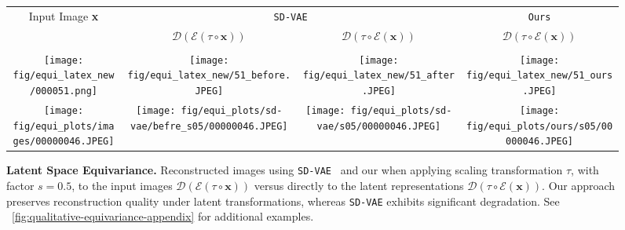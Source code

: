 \begin{figure}[t]
    \centering
    \setlength{\tabcolsep}{1.5pt}
    \begin{tabular}{cccc}
      \multirow{2}{*}{\small Input Image \textbf{x}}
      & \multicolumn{2}{c}{{\small \texttt{SD-VAE}}}
      & {\texttt{Ours}} \\
      \cmidrule(lr){2-3} \cmidrule(lr){4-4}
       
      & {\small$\mathcal{D} ( \mathcal{E}(\tau \circ \mathbf{x}))$}
      & {\small$\mathcal{D}(\tau \circ \mathcal{E}(\mathbf{x}))$}
      & {\small$\mathcal{D}(\tau \circ \mathcal{E}(\mathbf{x}))$} \\
      
      \vspace{-0.4cm} \\
      
     \texttt{[image: fig/equi\_latex\_new/000051.png]} 
      & \texttt{[image: fig/equi\_latex\_new/51\_before.JPEG]} 
      & \texttt{[image: fig/equi\_latex\_new/51\_after.JPEG]} 
      & \texttt{[image: fig/equi\_latex\_new/51\_ours.JPEG]} \\
      
      \texttt{[image: fig/equi\_plots/images/00000046.JPEG]} 
      & \texttt{[image: fig/equi\_plots/sd-vae/befre\_s05/00000046.JPEG]} 
      & \texttt{[image: fig/equi\_plots/sd-vae/s05/00000046.JPEG]} 
      & \texttt{[image: fig/equi\_plots/ours/s05/00000046.JPEG]} \\

    \end{tabular}
  \caption{
  \textbf{Latent Space Equivariance.} 
  Reconstructed images using \texttt{SD-VAE}~\cite{rombach2022high} and our \our when applying scaling transformation $\tau$, with factor $s=0.5$, to the input images $\mathcal{D}(\mathcal{E}(\tau \circ \mathbf{x}))$ versus directly to the latent representations $\mathcal{D}(\tau \circ \mathcal{E}(\mathbf{x}))$. Our approach preserves reconstruction quality under latent transformations, whereas \texttt{SD-VAE} exhibits significant degradation. See ~\autoref{fig:qualitative-equivariance-appendix} for additional examples.
  }
  \label{fig:qualitative-equivariance-main}
\end{figure}
